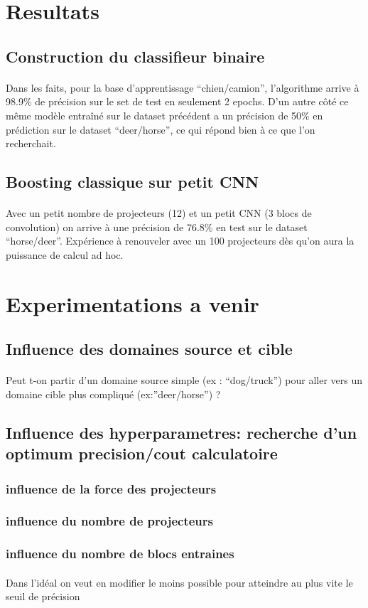 \documentclass[11 pt]{article}
\begin{document}
\section{Resultats}
\subsection{Construction du classifieur binaire}
\paragraph{}Dans les faits, pour la base d’apprentissage “chien/camion”, l’algorithme arrive à 98.9\% de précision sur le set de test en seulement 2 epochs. D’un autre côté ce même modèle entraîné sur le dataset précédent a un précision de 50\% en prédiction sur le dataset “deer/horse”, ce qui répond bien à ce que l’on recherchait.

\subsection{Boosting classique sur petit CNN}
\paragraph{}Avec un petit nombre de projecteurs (12) et un petit CNN (3 blocs de convolution) on arrive à une précision de 76.8\% en test sur le dataset “horse/deer”. Expérience à renouveler avec un 100 projecteurs dès qu’on aura la puissance de calcul ad hoc.

\section{Experimentations a venir}
\subsection{Influence des domaines source et cible}
\paragraph{}Peut t-on partir d’un domaine source simple (ex : “dog/truck”) pour aller vers un domaine cible plus compliqué (ex:”deer/horse”) ?

\subsection{Influence des hyperparametres: recherche d'un optimum precision/cout calculatoire}
\subsubsection{influence de la force des projecteurs}
\subsubsection{influence du nombre de projecteurs}
\subsubsection{influence du nombre de blocs entraines}
\paragraph{}Dans l’idéal on veut en modifier le moins possible pour atteindre au plus vite le seuil de précision
\end{document}
